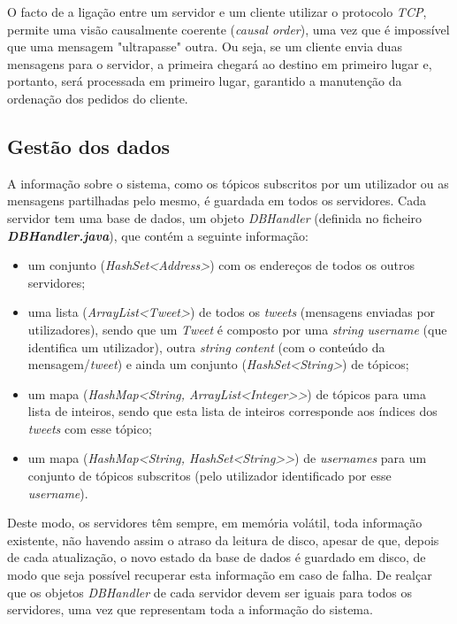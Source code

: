 \documentclass[a4paper]{report}
\begin{document}
		O facto de a ligação entre um servidor e um cliente utilizar o protocolo \textit{TCP}, permite uma visão causalmente coerente (\textit{causal order}), 
		uma vez que é impossível que uma mensagem "ultrapasse" outra. Ou seja, se um cliente envia duas mensagens para o servidor, a primeira chegará ao destino em primeiro lugar e, portanto, será processada em primeiro lugar, garantido a manutenção da ordenação dos pedidos do cliente.


		\subsection{Gestão dos dados}

		A informação sobre o sistema, como os tópicos subscritos por um utilizador ou as mensagens partilhadas pelo mesmo, é guardada em todos os servidores.
		Cada servidor tem uma base de dados, um objeto \textit{DBHandler} (definida no ficheiro \textit{\textbf{DBHandler.java}}), que contém a seguinte informação:
		\begin{itemize}
			\item um conjunto (\textit{HashSet<Address>}) com os endereços de todos os outros servidores;
			\item uma lista (\textit{ArrayList<Tweet>}) de todos os \textit{tweets} (mensagens enviadas por utilizadores), 
			sendo que um \textit{Tweet} é composto por uma \textit{string} \textit{username} (que identifica um utilizador), outra \textit{string} \textit{content} (com o conteúdo da mensagem/\textit{tweet})
			e ainda um conjunto (\textit{HashSet<String>}) de tópicos;
			\item um mapa (\textit{HashMap<String, ArrayList<Integer>>}) de tópicos para uma lista de inteiros, sendo que esta lista de inteiros corresponde aos índices dos \textit{tweets} com esse tópico;
			\item um mapa (\textit{HashMap<String, HashSet<String>>}) de \textit{usernames} para um conjunto de tópicos subscritos (pelo utilizador identificado por esse \textit{username}).
		\end{itemize}

		Deste modo, os servidores têm sempre, em memória volátil, toda informação existente, não havendo assim o atraso da leitura de disco, apesar de que, depois de cada atualização, o novo estado da base de dados é guardado em disco, de modo que seja possível recuperar esta informação em caso de falha.
		De realçar que os objetos \textit{DBHandler} de cada servidor devem ser iguais para todos os servidores, uma vez que representam toda a informação do sistema.
\end{document}
